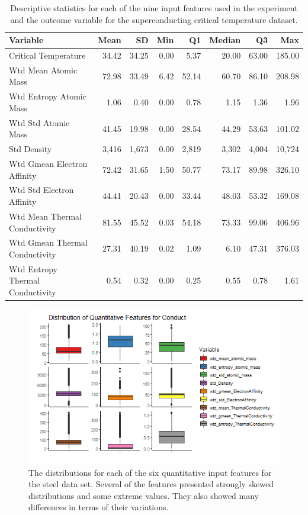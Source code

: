 \documentclass[10pt]{article}\usepackage[]{graphicx}\usepackage[]{xcolor}
\begin{document}
\begin{table}[h!]
  \begin{center}
    \begin{tabular}{l|r|r|r|r|r|r|r}
    \textbf{Variable} & \textbf{Mean} & \textbf{SD} & \textbf{Min} & \textbf{Q1} & \textbf{Median} & \textbf{Q3} & \textbf{Max} \\
      \hline
   Critical Temperature & 34.42 & 34.25 & 0.00 & 5.37 & 20.00 & 63.00 & 185.00 \\
   Wtd Mean Atomic Mass & 72.98 & 33.49 & 6.42 & 52.14 & 60.70 & 86.10 & 208.98 \\
   Wtd Entropy Atomic Mass & 1.06 & 0.40 & 0.00 & 0.78 & 1.15 & 1.36 & 1.96 \\
   Wtd Std Atomic Mass & 41.45 & 19.98 & 0.00 & 28.54 & 44.29 & 53.63 & 101.02 \\
   Std Density & 3,416 & 1,673 & 0.00 & 2,819 & 3,302 & 4,004 & 10,724 \\
   Wtd Gmean Electron Affinity & 72.42 & 31.65 & 1.50 & 50.77 & 73.17 & 89.98 & 326.10 \\
   Wtd Std Electron Affinity & 44.41 & 20.43 & 0.00 & 33.44 & 48.03 & 53.32 & 169.08 \\
   Wtd Mean Thermal Conductivity & 81.55 & 45.52 & 0.03 & 54.18 & 73.33 & 99.06 & 406.96 \\
   Wtd Gmean Thermal Conductivity & 27.31 & 40.19 & 0.02 & 1.09 & 6.10 & 47.31 & 376.03 \\
   Wtd Entropy Thermal Conductivity & 0.54 & 0.32 & 0.00 & 0.25 & 0.55 & 0.78 & 1.61 \\
    \end{tabular}
    \caption{Descriptive statistics for each of the nine input features used in the experiment and the outcome variable for the superconducting critical temperature dataset.}
    \label{tab:conduct_stats}
  \end{center}
\end{table}


\begin{figure}[htp]
  \centering
  \includegraphics[scale=0.8]{EDA/boxplots_conduct_features.png}
  \caption{The distributions for each of the six quantitative input features for the steel data set. Several of the features presented strongly skewed distributions and some extreme values. They also showed many differences in terms of their variations.}
  \label{img:conduct_boxplots}
\end{figure}
\end{document}
